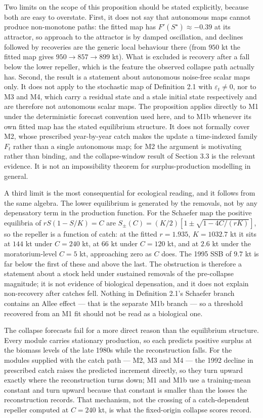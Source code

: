 \documentclass[11pt]{article}
\begin{document}
Two limits on the scope of this proposition should be stated
explicitly, because both are easy to overstate. First, it does not say
that autonomous maps cannot produce non-monotone paths: the fitted map
has \(F'(S^\star) \approx -0.39\) at its attractor, so approach to the
attractor is by damped oscillation, and declines followed by recoveries
are the generic local behaviour there (from \(950\) kt the fitted map
gives \(950 \to 857 \to 899\) kt). What is excluded is recovery after a
fall below the lower repeller, which is the feature the observed
collapse path actually has. Second, the result is a statement about
autonomous noise-free scalar maps only. It does not apply to the
stochastic map of Definition 2.1 with \(\varepsilon_t \neq 0\), nor to
M3 and M4, which carry a residual state and a stale initial state
respectively and are therefore not autonomous scalar maps. The
proposition applies directly to M1 under the deterministic forecast
convention used here, and to M1b whenever its own fitted map has the
stated equilibrium structure. It does not formally cover M2, whose
prescribed year-by-year catch makes the update a time-indexed family
\(F_t\) rather than a single autonomous map; for M2 the argument is
motivating rather than binding, and the collapse-window result of
Section 3.3 is the relevant evidence. It is not an impossibility
theorem for surplus-production modelling in general.

A third limit is the most consequential for ecological reading, and it
follows from the same algebra. The lower equilibrium is generated by the
removals, not by any depensatory term in the production function. For
the Schaefer map the positive equilibria of \(rS(1-S/K)=C\) are
\(S_{\pm}(C) = (K/2)\left[1 \pm \sqrt{1-4C/(rK)}\right]\), so the
repeller is a function of catch: at the fitted \(r = 1.935\),
\(K = 1032.7\) kt it sits at \(144\) kt under \(C = 240\) kt, at
\(66\) kt under \(C = 120\) kt, and at \(2.6\) kt under the
moratorium-level \(C = 5\) kt, approaching zero as \(C\) does. The
1995 SSB of \(9.7\) kt is far below the first of these and above the
last. The obstruction is therefore a statement about a stock held under
sustained removals of the pre-collapse magnitude; it is not evidence of
biological depensation, and it does not explain non-recovery after
catches fell. Nothing in Definition 2.1's Schaefer branch contains an
Allee effect --- that is the separate M1b branch --- so a threshold
recovered from an M1 fit should not be read as a biological one.

The collapse forecasts fail for a more direct reason than the
equilibrium structure. Every module carries stationary production, so
each predicts positive surplus at the biomass levels of the late 1980s
while the reconstruction falls. For the modules supplied with the catch
path --- M2, M3 and M4 --- the 1992 decline in prescribed catch raises
the predicted increment directly, so they turn upward exactly where the
reconstruction turns down; M1 and M1b use a training-mean constant and
turn upward because that constant is smaller than the losses the
reconstruction records. That mechanism, not the crossing of a
catch-dependent repeller computed at \(C = 240\) kt, is what the
fixed-origin collapse scores record.
\end{document}
